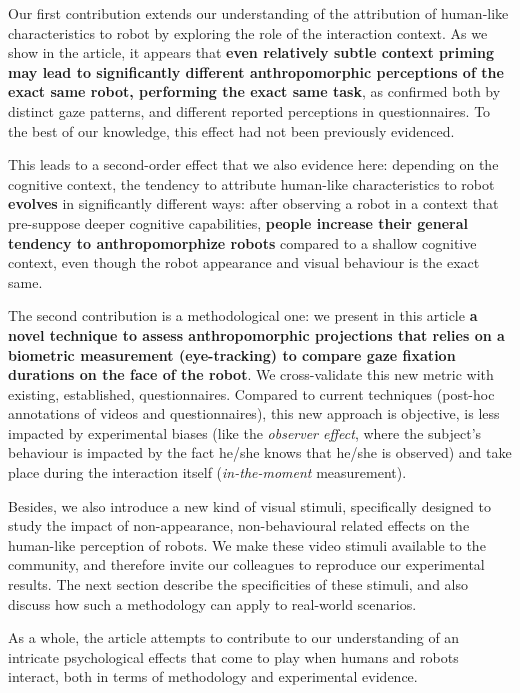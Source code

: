\documentclass[lettersize, noapacite, twoside, HRI]{apa_HRI}
\begin{document}
Our first contribution extends our understanding of the attribution of
human-like characteristics to robot by exploring the role of the interaction
context. As we show in the article, it appears that \textbf{even relatively
subtle context priming may lead to significantly different anthropomorphic
perceptions of the exact same robot, performing the exact same task}, as
confirmed both by distinct gaze patterns, and different reported perceptions in
questionnaires. To the best of our knowledge, this effect had not been previously
evidenced.

This leads to a second-order effect that we also evidence here: depending on the
cognitive context, the tendency to attribute human-like characteristics to robot
\textbf{evolves} in significantly different ways: after observing a robot in a
context that pre-suppose deeper cognitive capabilities, \textbf{people increase
their general tendency to anthropomorphize robots} compared to a shallow
cognitive context, even though the robot appearance and visual behaviour is the
exact same.

The second contribution is a methodological one: we present in this article
\textbf{a novel technique to assess anthropomorphic projections that relies on a
biometric measurement (eye-tracking) to compare gaze fixation durations on
the face of the robot}. We cross-validate this new metric with existing,
established, questionnaires. Compared to current techniques (post-hoc
annotations of videos and questionnaires), this new approach is objective,
is less impacted by experimental biases (like the \emph{observer effect},
where the subject's behaviour is impacted by the fact he/she knows that
he/she is observed) and take place during the interaction itself
(\emph{in-the-moment} measurement).

Besides, we also introduce a new kind of visual stimuli, specifically designed
to study the impact of non-appearance, non-behavioural related effects on the
human-like perception of robots. We make these video stimuli available to the
community, and therefore invite our colleagues to reproduce our experimental
results. The next section describe the specificities of these stimuli, and also
discuss how such a methodology can apply to real-world scenarios.

As a whole, the article attempts to contribute to our understanding of an
intricate psychological effects that come to play when humans and robots
interact, both in terms of methodology and experimental evidence.
\end{document}
